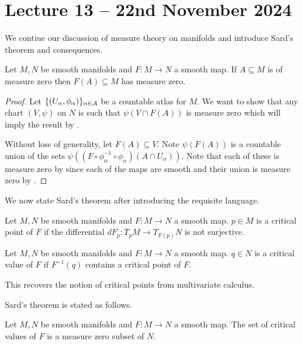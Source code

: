 \section{Lecture 13 -- 22nd November 2024}\label{sec: lecture 13}
We contiue our discussion of measure theory on manifolds and introduce Sard's theorem and consequences. 
\begin{lemma}\label{lem: image measure zero}
    Let $M,N$ be smooth manifolds and $F:M\to N$ a smooth map. If $A\subseteq M$ is of measure zero then $F(A)\subseteq M$ has measure zero. 
\end{lemma}
\begin{proof}
    Let $\{(U_{\alpha},\phi_{\alpha})\}_{\alpha\in\mathcal{A}}$ be a countable atlas for $M$. We want to show that any chart $(V,\psi)$ on $N$ is such that $\psi(V\cap F(A))$ is measure zero which will imply the result by . 

    Without loss of generality, let $F(A)\subseteq V$. Note $\psi(F(A))$ is a countable union of the sets $\psi((F\circ\phi_{\alpha}^{-1}\circ\phi_{\alpha})(A\cap U_{\alpha}))$. Note that each of these is measure zero by  since each of the maps are smooth and their union is measure zero by . 
\end{proof}
We now state Sard's theorem after introducing the requisite language. 
\begin{definition}\label{def: critical point}
    Let $M,N$ be smooth manifolds and $F:M\to N$ a smooth map. $p\in M$ is a critical point of $F$ if the differential $dF_{p}:T_{p}M\to T_{F(p)}N$ is not surjective. 
\end{definition}
\begin{definition}\label{def: critical value}
    Let $M,N$ be smooth manifolds and $F:M\to N$ a smooth map. $q\in N$ is a critical value of $F$ if $F^{-1}(q)$ contains a critical point of $F$. 
\end{definition}
\begin{remark}
    This recovers the notion of critical points from multivariate calculus. 
\end{remark}
Sard's theorem is stated as follows. 
\begin{theorem}[Sard]\label{thm: sard}
    Let $M,N$ be smooth manifolds and $F:M\to N$ a smooth map. The set of critical values of $F$ is a measure zero subset of $N$. 
\end{theorem}
